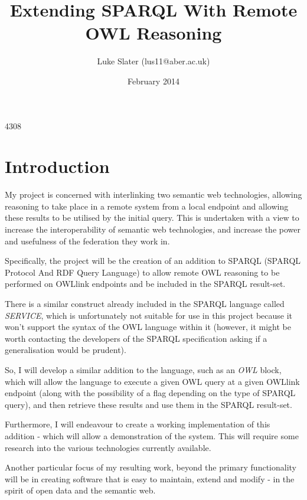 \documentclass{article}
\begin{document}
\setlength{\parskip}{\medskipamount}
\setlength{\parindent}{0pt}

\title{Extending SPARQL With Remote OWL Reasoning}
\author{Luke Slater (lus11@aber.ac.uk)}
\date{February 2014}

\maketitle

\pagebreak

4308

\section{Introduction}

My project is concerned with interlinking two semantic web technologies,
allowing reasoning to take place in a remote system from a local endpoint and
allowing these results to be utilised by the initial query. This is undertaken
with a view to increase the interoperability of semantic web technologies, and
increase the power and usefulness of the federation they work in.

Specifically, the project will be the creation of an addition to
SPARQL\cite{sparql} (SPARQL Protocol And RDF Query Language) to allow remote
OWL\cite{owlprimer} reasoning to be performed on OWLlink endpoints and be included in the
SPARQL result-set.

There is a similar construct already included in the SPARQL language called
\emph{SERVICE}, which is unfortunately not suitable for use in this project
because it won't support the syntax of the OWL language within it (however, it
might be worth contacting the developers of the SPARQL specification asking if a
generalisation would be prudent).

So, I will develop a similar addition to the language, such as an \emph{OWL}
block, which will allow the language to execute a given OWL query at a given
OWLlink endpoint (along with the possibility of a flag depending on the type of
SPARQL query), and then retrieve these results and use them in the SPARQL
result-set.

Furthermore, I will endeavour to create a working implementation of this
addition - which will allow a demonstration of the system. This will require
some research into the various technologies currently available.

Another particular focus of my resulting work, beyond the primary functionality
will be in creating software that is easy to maintain, extend and modify - in
the spirit of open data and the semantic web.
\end{document}
